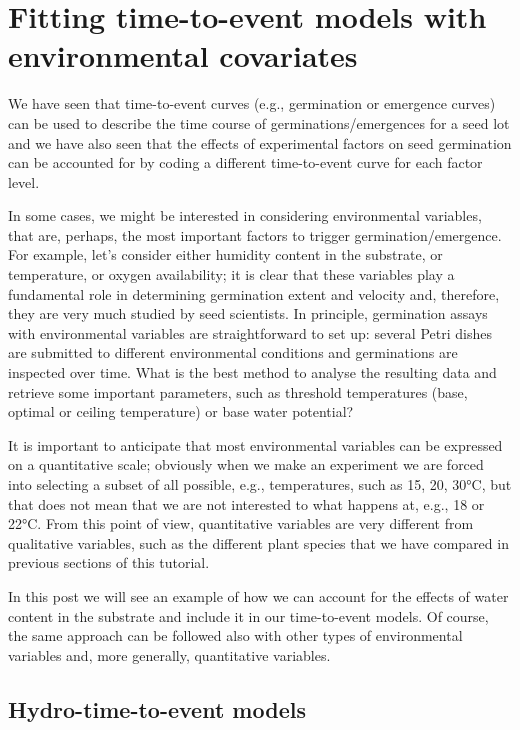 \documentclass[
]{book}
\begin{document}
\hypertarget{fitting-time-to-event-models-with-environmental-covariates}{%
\chapter{Fitting time-to-event models with environmental covariates}\label{fitting-time-to-event-models-with-environmental-covariates}}

We have seen that time-to-event curves (e.g., germination or emergence curves) can be used to describe the time course of germinations/emergences for a seed lot and we have also seen that the effects of experimental factors on seed germination can be accounted for by coding a different time-to-event curve for each factor level.

In some cases, we might be interested in considering environmental variables, that are, perhaps, the most important factors to trigger germination/emergence. For example, let's consider either humidity content in the substrate, or temperature, or oxygen availability; it is clear that these variables play a fundamental role in determining germination extent and velocity and, therefore, they are very much studied by seed scientists. In principle, germination assays with environmental variables are straightforward to set up: several Petri dishes are submitted to different environmental conditions and germinations are inspected over time. What is the best method to analyse the resulting data and retrieve some important parameters, such as threshold temperatures (base, optimal or ceiling temperature) or base water potential?

It is important to anticipate that most environmental variables can be expressed on a quantitative scale; obviously when we make an experiment we are forced into selecting a subset of all possible, e.g., temperatures, such as 15, 20, 30°C, but that does not mean that we are not interested to what happens at, e.g., 18 or 22°C. From this point of view, quantitative variables are very different from qualitative variables, such as the different plant species that we have compared in previous sections of this tutorial.

In this post we will see an example of how we can account for the effects of water content in the substrate and include it in our time-to-event models. Of course, the same approach can be followed also with other types of environmental variables and, more generally, quantitative variables.

\hypertarget{hydro-time-to-event-models}{%
\section{Hydro-time-to-event models}\label{hydro-time-to-event-models}}
\end{document}
